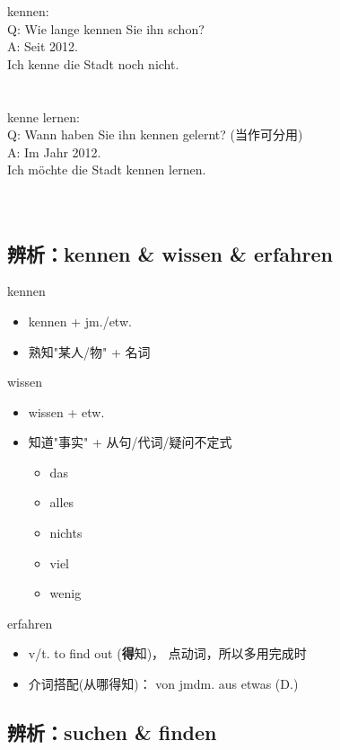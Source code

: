 \noindent
kennen: \\
Q: Wie lange kennen Sie ihn schon? \\
A: Seit 2012. \\
Ich kenne die Stadt noch nicht. \\
\\
\\
\noindent
kenne lernen: \\
Q: Wann haben Sie ihn kennen gelernt? (当作可分用) \\
A: Im Jahr 2012. \\
Ich möchte die Stadt kennen lernen. \\
\\
\\
\subsection{辨析：kennen \& wissen \& erfahren}
kennen
\begin{itemize}
    \item kennen + jm./etw.
    \item 熟知"某人/物" + 名词
\end{itemize}

wissen
\begin{itemize}
    \item wissen + etw.
    \item 知道"事实" + 从句/代词/疑问不定式
          \begin{itemize}
              \item das
              \item alles
              \item nichts
              \item viel
              \item wenig
          \end{itemize}
\end{itemize}

erfahren
\begin{itemize}
    \item v/t. to find out (\textbf{得}知)， 点动词，所以多用完成时
    \item 介词搭配(从哪得知)： von jmdm. aus etwas (D.)
\end{itemize}

\subsection{辨析：suchen \& finden}

